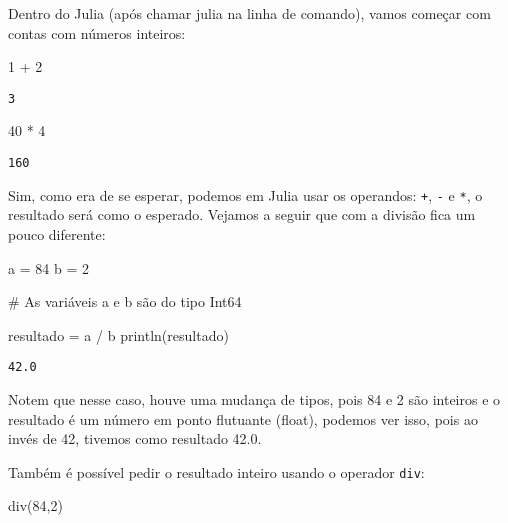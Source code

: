 \documentclass[
  letterpaper,
  DIV=11,
  numbers=noendperiod]{scrreprt}
\newenvironment{Shaded}{\begin{snugshade}}{\end{snugshade}}
\newcommand{\CommentTok}[1]{\textcolor[rgb]{0.37,0.37,0.37}{#1}}
\newcommand{\FloatTok}[1]{\textcolor[rgb]{0.68,0.00,0.00}{#1}}
\newcommand{\FunctionTok}[1]{\textcolor[rgb]{0.28,0.35,0.67}{#1}}
\newcommand{\NormalTok}[1]{\textcolor[rgb]{0.00,0.23,0.31}{#1}}
\newcommand{\OperatorTok}[1]{\textcolor[rgb]{0.37,0.37,0.37}{#1}}
\begin{document}
Dentro do Julia (após chamar julia na linha de comando), vamos começar
com contas com números inteiros:

\begin{Shaded}
\begin{Highlighting}[]
\FloatTok{1} \OperatorTok{+} \FloatTok{2}
\end{Highlighting}
\end{Shaded}

\begin{verbatim}
3
\end{verbatim}

\begin{Shaded}
\begin{Highlighting}[]
\FloatTok{40} \OperatorTok{*} \FloatTok{4}
\end{Highlighting}
\end{Shaded}

\begin{verbatim}
160
\end{verbatim}

Sim, como era de se esperar, podemos em Julia usar os operandos:
\texttt{+}, \texttt{-} e \texttt{*}, o resultado será como o esperado.
Vejamos a seguir que com a divisão fica um pouco diferente:

\begin{Shaded}
\begin{Highlighting}[]
\NormalTok{a }\OperatorTok{=} \FloatTok{84} 
\NormalTok{b }\OperatorTok{=} \FloatTok{2}

\CommentTok{\# As variáveis a e b são do tipo Int64}

\NormalTok{resultado }\OperatorTok{=}\NormalTok{ a }\OperatorTok{/}\NormalTok{ b}
\FunctionTok{println}\NormalTok{(resultado)}
\end{Highlighting}
\end{Shaded}

\begin{verbatim}
42.0
\end{verbatim}

Notem que nesse caso, houve uma mudança de tipos, pois 84 e 2 são
inteiros e o resultado é um número em ponto flutuante (float), podemos
ver isso, pois ao invés de 42, tivemos como resultado 42.0.

Também é possível pedir o resultado inteiro usando o operador
\texttt{div}:

\begin{Shaded}
\begin{Highlighting}[]
\FunctionTok{div}\NormalTok{(}\FloatTok{84}\NormalTok{,}\FloatTok{2}\NormalTok{)}
\end{Highlighting}
\end{Shaded}
\end{document}
